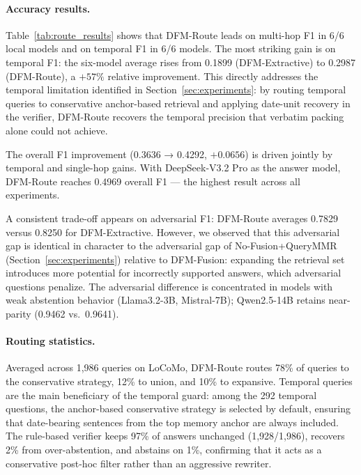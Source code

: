 \paragraph{Accuracy results.}
Table~\ref{tab:route_results} shows that DFM-Route leads on multi-hop F1 in 6/6 local models and on temporal F1 in 6/6 models.
The most striking gain is on temporal F1: the six-model average rises from 0.1899 (DFM-Extractive) to 0.2987 (DFM-Route), a $+57\%$ relative improvement.
This directly addresses the temporal limitation identified in Section~\ref{sec:experiments}: by routing temporal queries to conservative anchor-based retrieval and applying date-unit recovery in the verifier, DFM-Route recovers the temporal precision that verbatim packing alone could not achieve.

The overall F1 improvement (0.3636 → 0.4292, $+0.0656$) is driven jointly by temporal and single-hop gains.
With DeepSeek-V3.2 Pro as the answer model, DFM-Route reaches 0.4969 overall F1 --- the highest result across all experiments.

A consistent trade-off appears on adversarial F1: DFM-Route averages 0.7829 versus 0.8250 for DFM-Extractive.
However, we observed that this adversarial gap is identical in character to the adversarial gap of No-Fusion+QueryMMR (Section~\ref{sec:experiments}) relative to DFM-Fusion: expanding the retrieval set introduces more potential for incorrectly supported answers, which adversarial questions penalize.
The adversarial difference is concentrated in models with weak abstention behavior (Llama3.2-3B, Mistral-7B); Qwen2.5-14B retains near-parity (0.9462 vs.\ 0.9641).

\paragraph{Routing statistics.}
Averaged across 1,986 queries on LoCoMo, DFM-Route routes 78\% of queries to the conservative strategy, 12\% to union, and 10\% to expansive.
Temporal queries are the main beneficiary of the temporal guard: among the 292 temporal questions, the anchor-based conservative strategy is selected by default, ensuring that date-bearing sentences from the top memory anchor are always included.
The rule-based verifier keeps 97\% of answers unchanged (1,928/1,986), recovers 2\% from over-abstention, and abstains on 1\%, confirming that it acts as a conservative post-hoc filter rather than an aggressive rewriter.
